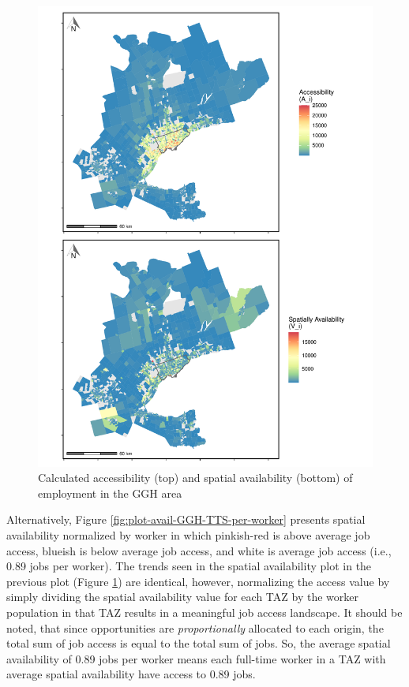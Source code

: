 \documentclass[Royal,times,sageh]{sagej}
\begin{document}
\begin{figure}
\includegraphics[width=1\linewidth]{Manuscript-Data-Package_files/figure-latex/plot-access-SA-GGH-TTS-1} \caption{\label{fig:plot-access-SA-GGH-TTS}Calculated accessibility (top) and spatial availability (bottom) of employment in the GGH area}\label{fig:plot-access-SA-GGH-TTS}
\end{figure}

\newpage

Alternatively, Figure \ref{fig:plot-avail-GGH-TTS-per-worker} presents
spatial availability normalized by worker in which pinkish-red is above
average job access, blueish is below average job access, and white is
average job access (i.e., 0.89 jobs per worker). The trends seen in the
spatial availability plot in the previous plot (Figure
\ref{fig:plot-access-SA-GGH-TTS}) are identical, however, normalizing
the access value by simply dividing the spatial availability value for
each TAZ by the worker population in that TAZ results in a meaningful
job access landscape. It should be noted, that since opportunities are
\emph{proportionally} allocated to each origin, the total sum of job
access is equal to the total sum of jobs. So, the average spatial
availability of 0.89 jobs per worker means each full-time worker in a
TAZ with average spatial availability have access to 0.89 jobs.
\end{document}
